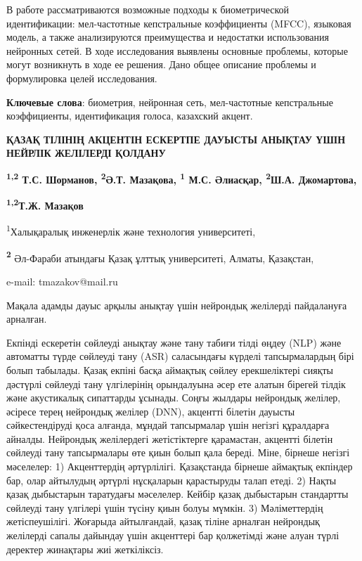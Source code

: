 В работе рассматриваются возможные подходы к биометрической
идентификации: мел-частотные кепстральные коэффициенты (MFCC), языковая
модель, а также анализируются преимущества и недостатки использования
нейронных сетей. В ходе исследования выявлены основные проблемы, которые
могут возникнуть в ходе ее решения. Дано общее описание проблемы и
формулировка целей исследования.

{\bfseries Ключевые слова}: биометрия, нейронная сеть, мел-частотные
кепстральные коэффициенты, идентификация голоса, казахский акцент.

\begin{articleheader}
{\bfseries ҚАЗАҚ ТІЛІНІҢ АКЦЕНТІН ЕСКЕРТПЕ ДАУЫСТЫ АНЫҚТАУ ҮШІН НЕЙРЛІК
ЖЕЛІЛЕРДІ ҚОЛДАНУ}

{\bfseries \textsuperscript{1,2} Т.С. Шорманов, \textsuperscript{2}Ә.Т.
Мазақова, \textsuperscript{1} М.С. Әлиасқар, \textsuperscript{2}Ш.А.
Джомартова,}
\end{articleheader}

\begin{affiliation}
{\bfseries \textsuperscript{1,2}Т.Ж. Мазақов\textsuperscript{\envelope }}

\textsuperscript{1}Халықаралық инженерлік және технология университеті,

{\bfseries \textsuperscript{2}} Әл-Фараби атындағы Қазақ ұлттық
университеті, Алматы, Қазақстан,

e-mail: tmazakov@mail.ru
\end{affiliation}

Мақала адамды дауыс арқылы анықтау үшін нейрондық желілерді пайдалануға
арналған.

Екпінді ескеретін сөйлеуді анықтау және тану табиғи тілді өңдеу (NLP)
және автоматты түрде сөйлеуді тану (ASR) саласындағы күрделі
тапсырмалардың бірі болып табылады. Қазақ екпіні басқа аймақтық сөйлеу
ерекшеліктері сияқты дәстүрлі сөйлеуді тану үлгілерінің орындалуына әсер
ете алатын бірегей тілдік және акустикалық сипаттарды ұсынады. Соңғы
жылдары нейрондық желілер, әсіресе терең нейрондық желілер (DNN),
акцентті білетін дауысты сәйкестендіруді қоса алғанда, мұндай
тапсырмалар үшін негізгі құралдарға айналды. Нейрондық желілердегі
жетістіктерге қарамастан, акцентті білетін сөйлеуді тану тапсырмалары
өте қиын болып қала береді. Міне, бірнеше негізгі мәселелер: 1)
Акценттердің әртүрлілігі. Қазақстанда бірнеше аймақтық екпіндер бар,
олар айтылудың әртүрлі нұсқаларын қарастыруды талап етеді. 2) Нақты
қазақ дыбыстарын таратудағы мәселелер. Кейбір қазақ дыбыстарын
стандартты сөйлеуді тану үлгілері үшін түсіну қиын болуы мүмкін. 3)
Мәліметтердің жетіспеушілігі. Жоғарыда айтылғандай, қазақ тіліне
арналған нейрондық желілерді сапалы дайындау үшін акценттері бар
қолжетімді және алуан түрлі деректер жинақтары жиі жеткіліксіз.

